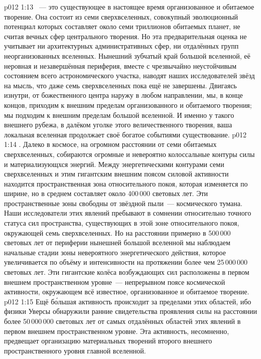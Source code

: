 \vs p012 1:13 ~--- это существующее в настоящее время организованное и обитаемое творение. Она состоит из семи сверхвселенных, совокупный эволюционный потенциал которых составляет около семи триллионов обитаемых планет, не считая вечных сфер центрального творения. Но эта предварительная оценка не учитывает ни архитектурных административных сфер, ни отдалённых групп неорганизованных вселенных. Нынешний зубчатый край большой вселенной, её неровная и незавершённая периферия, вместе с чрезвычайно неустойчивым состоянием всего астрономического участка, наводят наших исследователей звёзд на мысль, что даже семь сверхвселенных пока ещё не завершены. Двигаясь изнутри, от божественного центра наружу в любом направлении, мы, в конце концов, приходим к внешним пределам организованного и обитаемого творения; мы подходим к внешним пределам большой вселенной. И именно у такого внешнего рубежа, в далёком уголке этого величественного творения, ваша локальная вселенная продолжает своё богатое событиями существование.
\vs p012 1:14 . Далеко в космосе, на огромном расстоянии от семи обитаемых сверхвселенных, собираются огромные и невероятно колоссальные контуры силы и материализующхся энергий. Между энергетическими контурами семи сверхвселенных и этим гигантским внешним поясом силовой активности находится пространственная зона относительного покоя, которая изменяется по ширине, но в среднем составляет около 400\,000 световых лет. Эти пространственные зоны свободны от звёздной пыли~--- космического тумана. Наши исследователи этих явлений пребывают в сомнении относительно точного статуса сил пространства, существующих в этой зоне относительного покоя, окружающей семь сверхвселенных. Но на расстоянии примерно в 500\,000 световых лет от периферии нынешней большой вселенной мы наблюдаем начальные стадии зоны невероятного энергетического действия, которое увеличивается по объёму и интенсивности на протяжении более чем 25\,000\,000 световых лет. Эти гигантские колёса возбуждающих сил расположены в первом внешнем пространственном уровне~--- непрерывном поясе космической активности, окружающем всё известное, организованное и обитаемое творение.
\vs p012 1:15 Ещё б\'ольшая активность происходит за пределами этих областей, ибо физики Уверсы обнаружили ранние свидетельства проявления силы на расстоянии более 50\,000\,000 световых лет от самых отдалённых областей этих явлений в первом внешнем пространственном уровне. Эта активность, несомненно, предвещает организацию материальных творений второго внешнего пространственного уровня главной вселенной.
